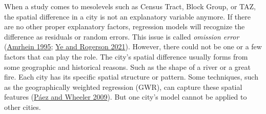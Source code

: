 \documentclass[
  12pt,
]{article}
\begin{document}
When a study comes to mesolevels such as Census Tract, Block Group, or TAZ, the spatial difference in a city is not an explanatory variable anymore. If there are no other proper explanatory factors, regression models will recognize the difference as residuals or random errors. This issue is called \emph{omission error} (\protect\hyperlink{ref-amrheinSearchingElusiveAggregation1995}{Amrhein 1995}; \protect\hyperlink{ref-yeImpactsModifiableAreal2021}{Ye and Rogerson 2021}). However, there could not be one or a few factors that can play the role. The city's spatial difference usually forms from some geographic and historical reasons. Such as the shape of a river or a great fire. Each city has its specific spatial structure or pattern. Some techniques, such as the geographically weighted regression (GWR), can capture these spatial features (\protect\hyperlink{ref-paezGeographicallyWeightedRegression2009}{Páez and Wheeler 2009}). But one city's model cannot be applied to other cities.
\end{document}
